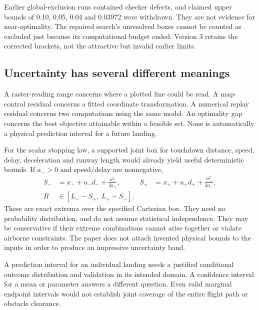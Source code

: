 Earlier global-exclusion runs contained checker defects, and claimed upper bounds of 0.10, 0.05, 0.04 and 0.03972 were withdrawn. They are not evidence for near-optimality. The repaired search's unresolved boxes cannot be counted as excluded just because its computational budget ended. Version 3 retains the corrected brackets, not the attractive but invalid earlier limits.

\clearpage
\subsection*{Uncertainty has several different meanings}
A raster-reading range concerns where a plotted line could be read. A map-control residual concerns a fitted coordinate transformation. A numerical replay residual concerns two computations using the same model. An optimality gap concerns the best objective attainable within a feasible set. None is automatically a physical prediction interval for a future landing.

For the scalar stopping law, a supported joint box for touchdown distance, speed, delay, deceleration and runway length would already yield useful deterministic bounds. If $a_->0$ and speed/delay are nonnegative,
\begin{align}
S_-&=x_-+u_-d_-+\frac{u_-^2}{2a_+}, &
S_+&=x_++u_+d_++\frac{u_+^2}{2a_-},\\
R&\in[L_- - S_+,\ L_+ - S_-].
\label{eq:box}
\end{align}
These are exact extrema over the specified Cartesian box. They need no probability distribution, and do not assume statistical independence. They may be conservative if their extreme combinations cannot arise together or violate airborne constraints. The paper does not attach invented physical bounds to the inputs in order to produce an impressive uncertainty band.

A prediction interval for an individual landing needs a justified conditional outcome distribution and validation in its intended domain. A confidence interval for a mean or parameter answers a different question. Even valid marginal endpoint intervals would not establish joint coverage of the entire flight path or obstacle clearance.

